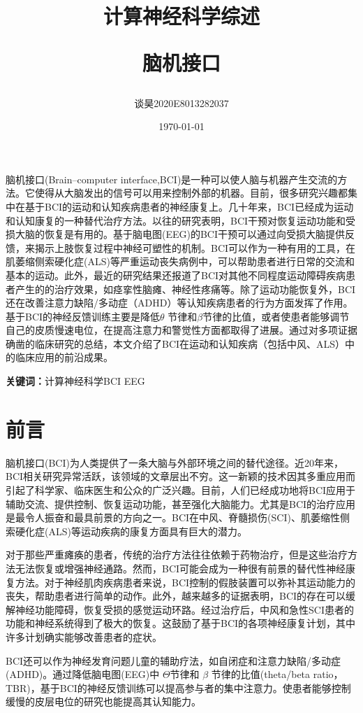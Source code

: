 \documentclass[UTF8,a4paper]{ctexart}
\title{\bfseries 计算神经科学综述 \\\begin{large}脑机接口\end{large}}
\author{谈昊\quad2020E8013282037}
\date{\today}
\begin{document}
\maketitle


\begin{center}
\parbox{130mm}{
脑机接口(Brain–computer interface,BCI)是一种可以使人脑与机器产生交流的方法。它使得从大脑发出的信号可以用来控制外部的机器。目前，很多研究兴趣都集中在基于BCI的运动和认知疾病患者的神经康复上。几十年来，BCI已经成为运动和认知康复的一种替代治疗方法。以往的研究表明，BCI干预对恢复运动功能和受损大脑的恢复是有用的。基于脑电图(EEG)的BCI干预可以通过向受损大脑提供反馈，来揭示上肢恢复过程中神经可塑性的机制。BCI可以作为一种有用的工具，在肌萎缩侧索硬化症(ALS)等严重运动丧失病例中，可以帮助患者进行日常的交流和基本的运动。此外，最近的研究结果还报道了BCI对其他不同程度运动障碍疾病患者产生的的治疗效果，如痉挛性脑瘫、神经性疼痛等。除了运动功能恢复外，BCI还在改善注意力缺陷/多动症（ADHD）等认知疾病患者的行为方面发挥了作用。基于BCI的神经反馈训练主要是降低$\theta$ 节律和$\beta$节律的比值，或者使患者能够调节自己的皮质慢速电位，在提高注意力和警觉性方面都取得了进展。通过对多项证据确凿的临床研究的总结，本文介绍了BCI在运动和认知疾病（包括中风、ALS）中的临床应用的前沿成果。
\par
\vspace{1mm}
{\bfseries 关键词：}计算神经科学\quad BCI \quad EEG}
\end{center}



\section{前言}
脑机接口(BCI)为人类提供了一条大脑与外部环境之间的替代途径。近20年来，BCI相关研究异常活跃，该领域的文章层出不穷。这一新颖的技术因其多重应用而引起了科学家、临床医生和公众的广泛兴趣。目前，人们已经成功地将BCI应用于辅助交流、提供控制、恢复运动功能，甚至强化大脑能力。尤其是BCI的治疗应用是最令人振奋和最具前景的方向之一。BCI在中风、脊髓损伤(SCI)、肌萎缩性侧索硬化症(ALS)等运动疾病的康复方面具有巨大的潜力。
\par
对于那些严重瘫痪的患者，传统的治疗方法往往依赖于药物治疗，但是这些治疗方法无法恢复或增强神经通路。然而，BCI可能会成为一种很有前景的替代性神经康复方法。对于神经肌肉疾病患者来说，BCI控制的假肢装置可以弥补其运动能力的丧失，帮助患者进行简单的动作。此外，越来越多的证据表明，BCI的存在可以缓解神经功能障碍，恢复受损的感觉运动环路。经过治疗后，中风和急性SCI患者的功能和神经系统得到了极大的恢复。这鼓励了基于BCI的各项神经康复计划，其中许多计划确实能够改善患者的症状。
\par
BCI还可以作为神经发育问题儿童的辅助疗法，如自闭症和注意力缺陷/多动症(ADHD)。通过降低脑电图(EEG)中 $\Theta$节律和 $\beta$ 节律的比值(theta/beta ratio，TBR)，基于BCI的神经反馈训练可以提高参与者的集中注意力。使患者能够控制缓慢的皮层电位的研究也能提高其认知能力。 
\end{document}
